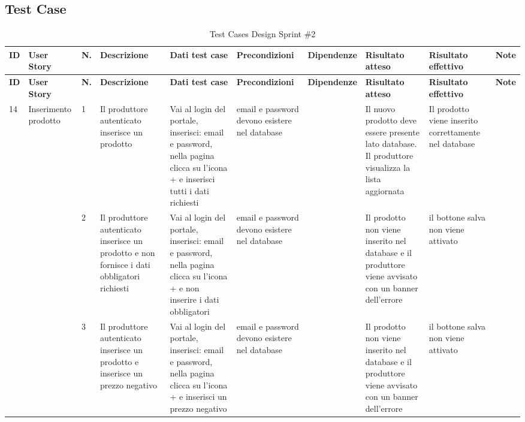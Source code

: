 \subsection{Test Case}

\begin{landscape}

\begin{longtable}
{p{0.4cm}|p{2.4cm}|p{0.4cm}|p{2.5cm}|p{3cm}|p{2.5cm}|p{2cm}|p{2.5cm}|p{2.5cm}|p{2cm}}
\caption{Test Cases Design Sprint \#2}\label{tab:TestCasesSprint2} \\
\hline
\textbf{ID} &\textbf{User Story} & \textbf{N.}& \textbf{Descrizione} & \textbf{Dati test case} & \textbf{Precondizioni} & \textbf{Dipendenze}& \textbf{Risultato atteso} & \textbf{Risultato effettivo} & \textbf{Note}  \\
\hline
\endfirsthead

\hline
\textbf{ID} &\textbf{User Story} & \textbf{N.} & \textbf{Descrizione} &\textbf{Dati test case} & \textbf{Precondizioni} & \textbf{Dipendenze}& \textbf{Risultato atteso} & \textbf{Risultato effettivo} & \textbf{Note}  \\
\hline
\endhead


\multirow{19}{0.2cm}{14} & \multirow{19}{0.2cm}{Inserimento prodotto} 
& 1 & Il produttore autenticato inserisce un prodotto & Vai al login del portale, inserisci: email e password, nella pagina clicca su l'icona + e inserisci tutti i dati richiesti & email e password devono esistere nel database& & Il nuovo prodotto deve essere presente lato database. Il produttore visualizza la lista aggiornata& Il prodotto viene inserito correttamente nel database& \\

&& 2 & Il produttore autenticato inserisce un prodotto e non fornisce i dati obbligatori richiesti & Vai al login del portale, inserisci: email e password, nella pagina clicca su l'icona + e non inserire i dati obbligatori  & email e password devono esistere nel database& & Il prodotto non viene inserito nel database e il produttore viene avvisato con un banner dell'errore& il bottone salva non viene attivato& \\

&& 3 & Il produttore autenticato inserisce un prodotto e inserisce un prezzo negativo & Vai al login del portale, inserisci: email e password, nella pagina clicca su l'icona + e inserisci un prezzo negativo & email e password devono esistere nel database& & Il prodotto non viene inserito nel database e il produttore viene avvisato con un banner dell'errore& il bottone salva non viene attivato& \\


\end{longtable}
\end{landscape}
